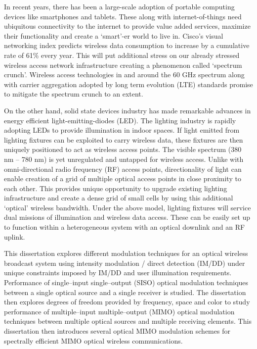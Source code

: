 In recent years, there has been a large-scale adoption of portable computing devices like smartphones and tablets. These along with internet-of-things need ubiquitous connectivity to the internet to provide value added services, maximize their functionality and create a `smart'-er world to live in. Cisco's visual networking index predicts wireless data consumption to increase by a cumulative rate of 61\% every year. This will put additional stress on our already stressed wireless access network infrastructure creating a phenomenon called `spectrum crunch'. Wireless access technologies in and around the 60 GHz spectrum along with carrier aggregation adopted by long term evolution (LTE) standards promise to mitigate the spectrum crunch to an extent.

On the other hand, solid state devices industry has made remarkable advances in energy efficient light-emitting-diodes (LED). The lighting industry is rapidly adopting LEDs to provide illumination in indoor spaces. If light emitted from lighting fixtures can be exploited to carry wireless data, these fixtures are then uniquely positioned to act as wireless access points. The visible spectrum (380 nm -- 780 nm) is yet unregulated and untapped for wireless access. Unlike with omni-directional radio frequency (RF) access points, directionality of light can enable creation of a grid of multiple optical access points in close proximity to each other. This provides unique opportunity to upgrade existing lighting infrastructure and create a dense grid of small cells by using this additional `optical' wireless bandwidth. Under the above model, lighting fixtures will service dual missions of illumination and wireless data access. These can be easily set up to function within a heterogeneous system with an optical downlink and an RF uplink. 

This dissertation explores different modulation techniques for an optical wireless broadcast system using intensity modulation / direct detection (IM/DD) under unique constraints imposed by IM/DD and user illumination requirements. Performance of single--input single--output (SISO) optical modulation techniques between a single optical source and a single receiver is studied. The dissertation then explores degrees of freedom provided by frequency, space and color to study performance of multiple--input multiple--output (MIMO) optical modulation techniques between multiple optical sources and multiple receiving elements. This dissertation then introduces several optical MIMO modulation schemes for spectrally efficient MIMO optical wireless communications.